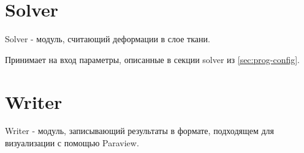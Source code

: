 \section{Solver}\label{sec:prog-solver}
Solver - модуль, считающий деформации в слое ткани.

Принимает на вход параметры, описанные в секции solver из \ref{sec:prog-config}.

\section{Writer}\label{sec:prog-writer}
Writer - модуль, записывающий результаты в формате, подходящем для визуализации с помощью Paraview.
